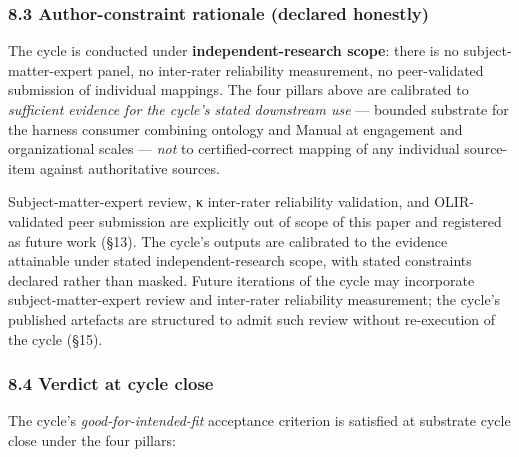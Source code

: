 \documentclass[
]{article}
\begin{document}
\subsubsection{8.3 Author-constraint rationale (declared
honestly)}\label{author-constraint-rationale-declared-honestly}

The cycle is conducted under \textbf{independent-research scope}: there
is no subject-matter-expert panel, no inter-rater reliability
measurement, no peer-validated submission of individual mappings. The
four pillars above are calibrated to \emph{sufficient evidence for the
cycle's stated downstream use} --- bounded substrate for the harness
consumer combining ontology and Manual at engagement and organizational
scales --- \emph{not} to certified-correct mapping of any individual
source-item against authoritative sources.

Subject-matter-expert review, κ inter-rater reliability validation, and
OLIR-validated peer submission are explicitly out of scope of this paper
and registered as future work (§13). The cycle's outputs are calibrated
to the evidence attainable under stated independent-research scope, with
stated constraints declared rather than masked. Future iterations of the
cycle may incorporate subject-matter-expert review and inter-rater
reliability measurement; the cycle's published artefacts are structured
to admit such review without re-execution of the cycle (§15).

\subsubsection{8.4 Verdict at cycle close}\label{verdict-at-cycle-close}

The cycle's \emph{good-for-intended-fit} acceptance criterion is
satisfied at substrate cycle close under the four pillars:
\end{document}
